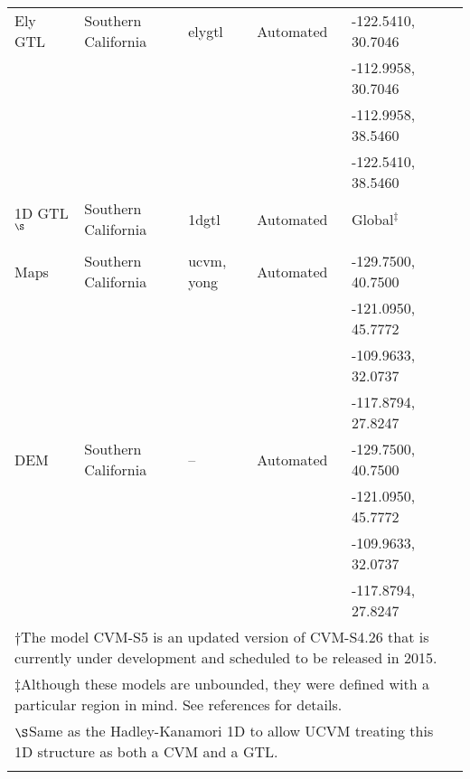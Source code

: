 \begin{table*}
\begin{tabular}[]{llllll}
\hline
Ely GTL            & Southern California   & elygtl        &  Automated   & -122.5410, 30.7046 & \citet{Ely_2010_AGU}         \\
                   &                       &               &              & -112.9958, 30.7046 &                              \\
                   &                       &               &              & -112.9958, 38.5460 &                              \\
                   &                       &               &              & -122.5410, 38.5460 &                              \\
1D GTL$^\S$        & Southern California   & 1dgtl         &  Automated   & Global$^\ddagger$  & \citet{Kanamori_1975_Chap}   \\
                   &                       &               &              &                    & \citet{Hadley_1977_GSAB}     \\
\vsthirty{} Maps   & Southern California   & ucvm, yong    &  Automated   & -129.7500, 40.7500 & \citet{Wills_2006_BSSA}      \\
                   &                       &               &              & -121.0950, 45.7772 & \citet{Wald_2007_BSSA}       \\
                   &                       &               &              & -109.9633, 32.0737 & \citet{Yong_2012_BSSA}       \\
                   &                       &               &              & -117.8794, 27.8247 &                              \\
DEM                & Southern California   & --            &  Automated   & -129.7500, 40.7500 & \citet{Gesch_2002_PERS}      \\
                   &                       &               &              & -121.0950, 45.7772 & \citet{Gesch_2007_Chap}      \\
                   &                       &               &              & -109.9633, 32.0737 &                              \\
                   &                       &               &              & -117.8794, 27.8247 &                              \\
\hline
\multicolumn{6}{l}{$\dagger$\quad\footnotesize The model CVM-S5 is an updated version of CVM-S4.26 that is currently under development and scheduled to be released in 2015.}\\
\multicolumn{6}{l}{$\ddagger$\quad\footnotesize Although these models are unbounded, they were defined with a particular region in mind. See references for details.}\\
\multicolumn{6}{l}{$\S$\quad\footnotesize Same as the Hadley-Kanamori 1D to allow UCVM treating this 1D structure as both a CVM and a GTL.}\\
\\
\end{tabular}
\label{tab:cvms}
\end{table*}


